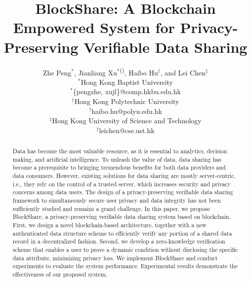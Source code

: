 \documentclass[11pt,divpdfm]{article}
\begin{document}
\title{BlockShare: A Blockchain Empowered System for Privacy-Preserving Verifiable Data Sharing}

\author{
Zhe Peng$^*$, Jianliang Xu$^*$\textsuperscript{(\Letter)}, Haibo Hu$^\dagger$, and Lei Chen$^\ddagger$\\
$^*$Hong Kong Baptist University\\
$^*$\{pengzhe, xujl\}@comp.hkbu.edu.hk\\
$^\dagger$Hong Kong Polytechnic University\\
$^\dagger$haibo.hu@polyu.edu.hk\\
$^\ddagger$Hong Kong University of Science and Technology\\
$^\ddagger$leichen@cse.ust.hk
}


\maketitle

\begin{abstract}
Data has become the most valuable resource, as it is essential to analytics, decision making, and artificial intelligence.
To unleash the value of data, data sharing has become a prerequisite to bringing tremendous benefits for both data providers and data consumers.
However, existing solutions for data sharing are mostly server-centric, i.e., they rely on the control of a trusted server, which increases security and privacy concerns among data users.
The design of a privacy-preserving verifiable data sharing framework to simultaneously secure user privacy and data integrity has not been sufficiently studied and remains a grand challenge.
In this paper, we propose BlockShare, a privacy-preserving verifiable data sharing system based on blockchain.
First, we design a novel blockchain-based architecture, together with a new authenticated data structure scheme to efficiently verify any portion of a shared data record in a decentralized fashion.
Second, we develop a zero-knowledge verification scheme that enables a user to prove a dynamic condition without disclosing the specific data attribute, minimizing privacy loss.
We implement BlockShare and conduct experiments to evaluate the system performance.
Experimental results demonstrate the effectiveness of our proposed system.
\end{abstract}
\end{document}
